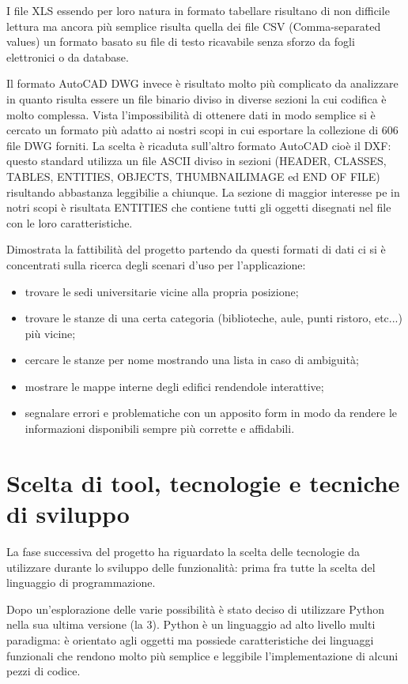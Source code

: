\documentclass[12pt]{report}
\begin{document}
I file XLS essendo per loro natura in formato tabellare risultano di non difficile lettura ma ancora più semplice risulta quella dei file CSV (Comma-separated values) un formato basato su file di testo ricavabile senza sforzo da fogli elettronici o da database. 

Il formato AutoCAD DWG invece è risultato molto più complicato da analizzare in quanto risulta essere un file binario diviso in diverse sezioni la cui codifica è molto complessa. Vista l'impossibilità di ottenere dati in modo semplice si è cercato un formato più adatto ai nostri scopi in cui esportare la collezione di 606 file DWG forniti. La scelta è ricaduta sull'altro formato AutoCAD cioè il DXF: questo standard utilizza un file ASCII diviso in sezioni (HEADER, CLASSES, TABLES, ENTITIES, OBJECTS, THUMBNAILIMAGE ed END OF FILE) risultando abbastanza leggibilie a chiunque. La sezione di maggior interesse pe in notri scopi è risultata ENTITIES che contiene tutti gli oggetti disegnati nel file con le loro caratteristiche.

Dimostrata la fattibilità del progetto partendo da questi formati di dati ci si è concentrati sulla ricerca degli scenari d'uso per l'applicazione:        
\begin{itemize}
\item trovare le sedi universitarie vicine alla propria posizione;
\item trovare le stanze di una certa categoria (biblioteche, aule, punti ristoro, etc...) più vicine;
\item cercare le stanze per nome mostrando una lista in caso di ambiguità;
\item mostrare le mappe interne degli edifici rendendole interattive;
\item segnalare errori e problematiche con un apposito form in modo da rendere le informazioni disponibili sempre più corrette e affidabili.
\end{itemize}


\section{Scelta di tool, tecnologie e tecniche di sviluppo}

La fase successiva del progetto ha riguardato la scelta delle tecnologie da utilizzare durante lo sviluppo delle funzionalità: prima fra tutte la scelta del linguaggio di programmazione.

Dopo un'esplorazione delle varie possibilità è stato deciso di utilizzare Python nella sua ultima versione (la 3). Python è un linguaggio ad alto livello multi paradigma: è orientato agli oggetti ma possiede caratteristiche dei linguaggi funzionali che rendono molto più semplice e leggibile l'implementazione di alcuni pezzi di codice.
\end{document}
